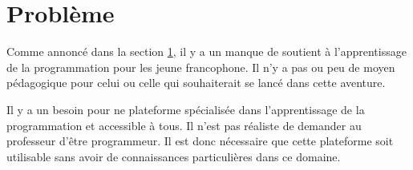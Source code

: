\section{Problème}
\label{into-problem}
Comme annoncé dans la section \ref{into-problem}, il y a un manque de soutient à l'apprentissage de la programmation pour les jeune francophone. Il n'y a pas ou peu de moyen pédagogique pour celui ou celle qui souhaiterait se lancé dans cette aventure.

Il y a un besoin pour ne plateforme spécialisée dans l'apprentissage de la programmation et accessible à tous. Il n'est pas réaliste de demander au professeur d'être programmeur. Il est donc nécessaire que cette plateforme soit utilisable sans avoir de connaissances particulières dans ce domaine.
